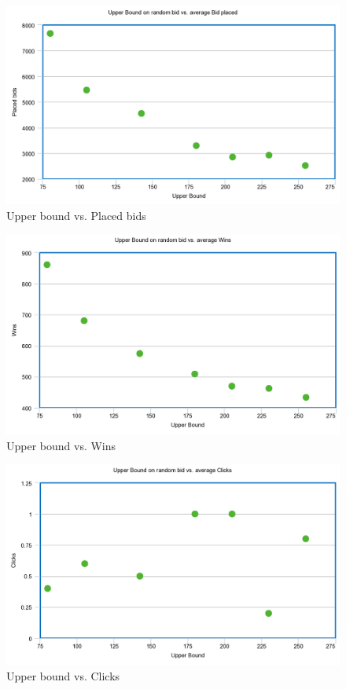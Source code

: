 \documentclass{sig-alternate-05-2015}
\begin{document}
\begin{figure}
  \includegraphics[width=\linewidth]{random_bids.png}
  \caption{Upper bound vs. Placed bids}
  \label{fig:bids}
\end{figure}

\begin{figure}
  \includegraphics[width=\linewidth]{random_wins.png}
  \caption{Upper bound vs. Wins}
  \label{fig:wins}
\end{figure}

\begin{figure}
  \includegraphics[width=\linewidth]{random_clicks.png}
  \caption{Upper bound vs. Clicks}
  \label{fig:clicks}
\end{figure}
\end{document}
